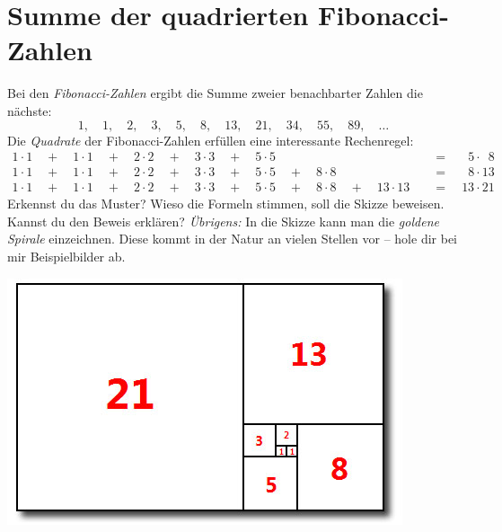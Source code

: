 \documentclass[a5paper,ngerman,landscape,11pt]{scrartcl}
\begin{document}
\section*{Summe der quadrierten Fibonacci-Zahlen}
Bei den \emph{Fibonacci-Zahlen} ergibt die Summe zweier benachbarter Zahlen die
nächste:
\[ 1,\quad 1,\quad 2,\quad 3,\quad 5,\quad 8,\quad 13,\quad 21,\quad 34,\quad 55,\quad 89,\quad \ldots \]
Die \emph{Quadrate} der Fibonacci-Zahlen erfüllen eine interessante Rechenregel:
\begin{align*}
  1\cdot1 \quad+\quad 1\cdot1 \quad+\quad 2\cdot2 \quad+\quad 3\cdot3 \quad+\quad 5\cdot5 \phantom{{} \quad+\quad 8\cdot8 \quad+\quad 13\cdot13}
    &{\quad}=\quad \phantom{0}5 \cdot \phantom{0}8 \\
  1\cdot1 \quad+\quad 1\cdot1 \quad+\quad 2\cdot2 \quad+\quad 3\cdot3 \quad+\quad 5\cdot5 \quad+\quad 8\cdot8 \phantom{{} \quad+\quad 13\cdot13}
    &{\quad}=\quad \phantom{0}8 \cdot 13 \\
  1\cdot1 \quad+\quad 1\cdot1 \quad+\quad 2\cdot2 \quad+\quad 3\cdot3 \quad+\quad 5\cdot5 \quad+\quad 8\cdot8 \quad+\quad 13\cdot13
    &{\quad}=\quad 13 \cdot 21
\end{align*}
Erkennst du das Muster? Wieso die Formeln stimmen, soll die Skizze beweisen.
Kannst du den Beweis erklären?
\emph{Übrigens:} In die Skizze kann man die \emph{goldene Spirale} einzeichnen.
Diese kommt in der Natur an vielen Stellen vor -- hole dir bei mir Beispielbilder ab.

\vfill
\begin{center}
\includegraphics[scale=0.6]{fibonacci-quadrate}
\end{center}
\end{document}
